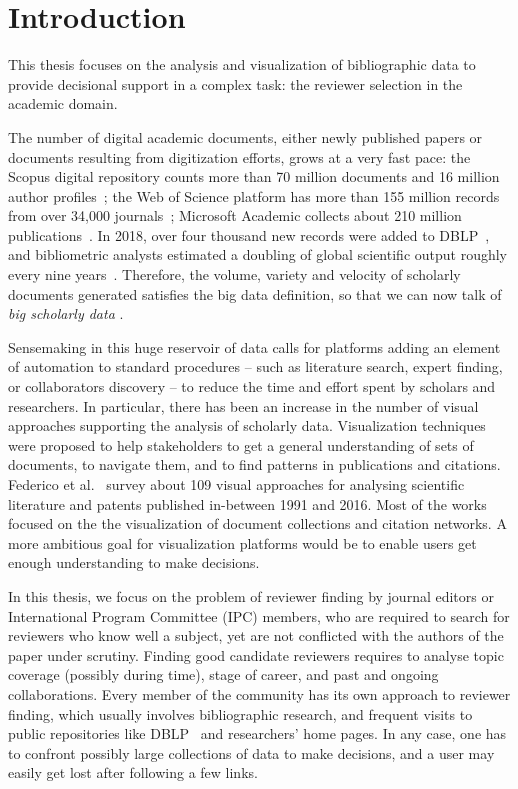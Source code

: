 \chapter{Introduction}
\label{sec:introduction}

This thesis focuses on the analysis and visualization of bibliographic data to provide decisional support in a complex task: the reviewer selection in the academic domain. 

The number of digital academic documents, either newly published papers or documents resulting from digitization efforts, grows at a very fast pace: the Scopus digital repository counts more than 70 million documents and 16 million author profiles~\cite{scopus}; the Web of Science platform has more than 155 million records from over 34,000 journals~\cite{WoS}; Microsoft Academic collects about 210 million publications~\cite{MA}. In 2018, over four thousand new records were added to DBLP~\cite{DBLPrate}, and bibliometric analysts estimated a doubling of global scientific output roughly every nine years~\cite{BoMu15}. Therefore, the volume, variety and velocity of scholarly documents generated satisfies the big data definition, so that we can now talk of \emph{big scholarly data} \cite{KhLi17}. 

Sensemaking in this huge reservoir of data calls for platforms adding an element of automation to standard procedures -- such as literature search, expert finding, or collaborators discovery -- to reduce the time and effort spent by scholars and researchers. In particular, there has been an increase in the number of visual approaches supporting the analysis of scholarly data. Visualization techniques were proposed to help stakeholders to get a general understanding of sets of documents, to navigate them, and to find patterns in publications and citations. Federico et al.~\cite{FeHe17} survey about 109 visual approaches for analysing scientific literature and patents published in-between 1991 and 2016. Most of the works focused on the the visualization of document collections and citation networks. A more ambitious goal for visualization platforms would be to enable users get enough understanding to make decisions. 

In this thesis, we focus on the problem of reviewer finding by journal editors or International Program Committee (IPC) members, who are required to search for reviewers who know well a subject, yet are not conflicted with the authors of the paper under scrutiny. Finding good candidate reviewers requires to analyse topic coverage (possibly during time), stage of career, and past and ongoing collaborations. Every member of the community has its own approach to reviewer finding, which usually involves bibliographic research, and frequent visits to public repositories like DBLP~\cite{ley2002dblp} and researchers' home pages. In any case, one has to confront possibly large collections of data to make decisions, and a user may easily get lost after following a few links.  

